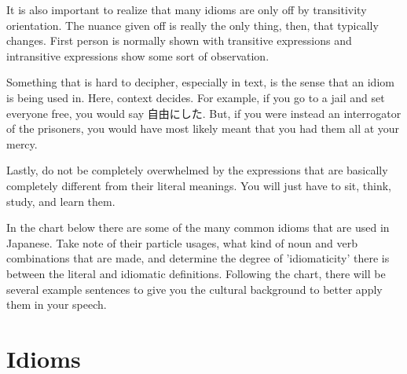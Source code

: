 \par{It is also important to realize that many idioms are only off by transitivity orientation. The nuance given off is really the only thing, then, that typically changes. First person is normally shown with transitive expressions and intransitive expressions show some sort of observation. }

\par{Something that is hard to decipher, especially in text, is the sense that an idiom is being used in. Here, context decides. For example, if you go to a jail and set everyone free, you would say 自由にした. But, if you were instead an interrogator of the prisoners, you would have most likely meant that you had them all at your mercy. }

\par{Lastly, do not be completely overwhelmed by the expressions that are basically completely different from their literal meanings. You will just have to sit, think, study, and learn them. }

\par{ In the chart below there are some of the many common idioms that are used in Japanese. Take note of their particle usages, what kind of noun and verb combinations that are made, and determine the degree of 'idiomaticity' there is between the literal and idiomatic definitions. Following the chart, there will be several example sentences to give you the cultural background to better apply them in your speech. }
      
\section{Idioms}
 
